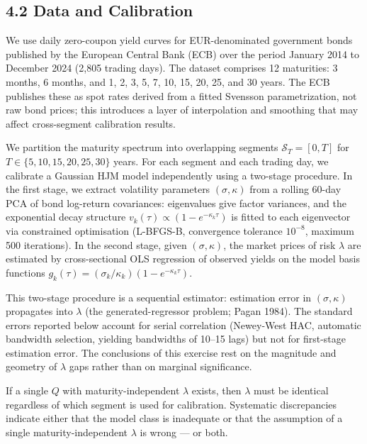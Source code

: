 \documentclass[
]{article}
\begin{document}
\subsection{4.2 Data and Calibration}\label{data-and-calibration}

We use daily zero-coupon yield curves for EUR-denominated government
bonds published by the European Central Bank (ECB) over the period
January 2014 to December 2024 (2,805 trading days). The dataset
comprises 12 maturities: 3 months, 6 months, and 1, 2, 3, 5, 7, 10, 15,
20, 25, and 30 years. The ECB publishes these as spot rates derived from
a fitted Svensson parametrization, not raw bond prices; this introduces
a layer of interpolation and smoothing that may affect cross-segment
calibration results.

We partition the maturity spectrum into overlapping segments
\(\mathcal{S}_T = [0, T]\) for \(T \in \{5, 10, 15, 20, 25, 30\}\)
years. For each segment and each trading day, we calibrate a Gaussian
HJM model independently using a two-stage procedure. In the first stage,
we extract volatility parameters \((\sigma, \kappa)\) from a rolling
60-day PCA of bond log-return covariances: eigenvalues give factor
variances, and the exponential decay structure
\(v_k(\tau) \propto (1 - e^{-\kappa_k \tau})\) is fitted to each
eigenvector via constrained optimisation (L-BFGS-B, convergence
tolerance \(10^{-8}\), maximum 500 iterations). In the second stage,
given \((\sigma, \kappa)\), the market prices of risk \(\lambda\) are
estimated by cross-sectional OLS regression of observed yields on the
model basis functions
\(g_k(\tau) = (\sigma_k / \kappa_k)(1 - e^{-\kappa_k \tau})\).

This two-stage procedure is a sequential estimator: estimation error in
\((\sigma, \kappa)\) propagates into \(\lambda\) (the
generated-regressor problem; Pagan 1984). The standard errors reported
below account for serial correlation (Newey-West HAC, automatic
bandwidth selection, yielding bandwidths of 10--15 lags) but not for
first-stage estimation error. The conclusions of this exercise rest on
the magnitude and geometry of \(\lambda\) gaps rather than on marginal
significance.

If a single \(Q\) with maturity-independent \(\lambda\) exists, then
\(\lambda\) must be identical regardless of which segment is used for
calibration. Systematic discrepancies indicate either that the model
class is inadequate or that the assumption of a single
maturity-independent \(\lambda\) is wrong --- or both.
\end{document}
